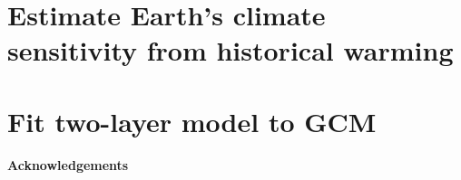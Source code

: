\documentclass[12pt]{book}
\begin{document}
\section{Estimate Earth's climate sensitivity from historical warming}


\section{Fit two-layer model to GCM}






\newpage



\vspace{5 mm}
\noindent
{\bf Acknowledgements} 



\newpage
\end{document}
